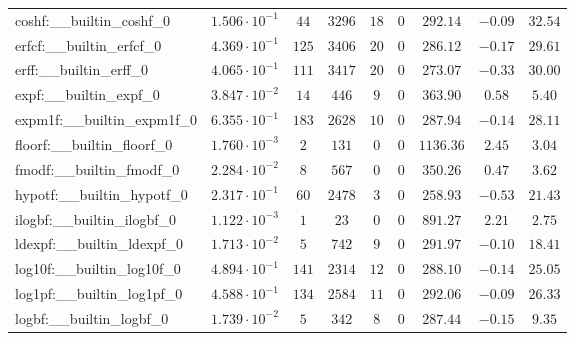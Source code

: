 \begin{tabular}{|l|c|c|c|c|c|c|c|c|}
coshf:\_\_builtin\_coshf\_0               & $ 1.506 \cdot 10^{-1} $ & $ 44     $ & $ 3296  $ & $ 18  $ & $ 0   $ & $ 292.14      $ & $ -0.09   $ & $ 32.54   $ \\
erfcf:\_\_builtin\_erfcf\_0               & $ 4.369 \cdot 10^{-1} $ & $ 125    $ & $ 3406  $ & $ 20  $ & $ 0   $ & $ 286.12      $ & $ -0.17   $ & $ 29.61   $ \\
erff:\_\_builtin\_erff\_0                 & $ 4.065 \cdot 10^{-1} $ & $ 111    $ & $ 3417  $ & $ 20  $ & $ 0   $ & $ 273.07      $ & $ -0.33   $ & $ 30.00   $ \\
expf:\_\_builtin\_expf\_0                 & $ 3.847 \cdot 10^{-2} $ & $ 14     $ & $ 446   $ & $ 9   $ & $ 0   $ & $ 363.90      $ & $ 0.58    $ & $ 5.40    $ \\
expm1f:\_\_builtin\_expm1f\_0             & $ 6.355 \cdot 10^{-1} $ & $ 183    $ & $ 2628  $ & $ 10  $ & $ 0   $ & $ 287.94      $ & $ -0.14   $ & $ 28.11   $ \\
floorf:\_\_builtin\_floorf\_0             & $ 1.760 \cdot 10^{-3} $ & $ 2      $ & $ 131   $ & $ 0   $ & $ 0   $ & $ 1136.36     $ & $ 2.45    $ & $ 3.04    $ \\
fmodf:\_\_builtin\_fmodf\_0               & $ 2.284 \cdot 10^{-2} $ & $ 8      $ & $ 567   $ & $ 0   $ & $ 0   $ & $ 350.26      $ & $ 0.47    $ & $ 3.62    $ \\
hypotf:\_\_builtin\_hypotf\_0             & $ 2.317 \cdot 10^{-1} $ & $ 60     $ & $ 2478  $ & $ 3   $ & $ 0   $ & $ 258.93      $ & $ -0.53   $ & $ 21.43   $ \\
ilogbf:\_\_builtin\_ilogbf\_0             & $ 1.122 \cdot 10^{-3} $ & $ 1      $ & $ 23    $ & $ 0   $ & $ 0   $ & $ 891.27      $ & $ 2.21    $ & $ 2.75    $ \\
ldexpf:\_\_builtin\_ldexpf\_0             & $ 1.713 \cdot 10^{-2} $ & $ 5      $ & $ 742   $ & $ 9   $ & $ 0   $ & $ 291.97      $ & $ -0.10   $ & $ 18.41   $ \\
log10f:\_\_builtin\_log10f\_0             & $ 4.894 \cdot 10^{-1} $ & $ 141    $ & $ 2314  $ & $ 12  $ & $ 0   $ & $ 288.10      $ & $ -0.14   $ & $ 25.05   $ \\
log1pf:\_\_builtin\_log1pf\_0             & $ 4.588 \cdot 10^{-1} $ & $ 134    $ & $ 2584  $ & $ 11  $ & $ 0   $ & $ 292.06      $ & $ -0.09   $ & $ 26.33   $ \\
logbf:\_\_builtin\_logbf\_0               & $ 1.739 \cdot 10^{-2} $ & $ 5      $ & $ 342   $ & $ 8   $ & $ 0   $ & $ 287.44      $ & $ -0.15   $ & $ 9.35    $ \\

\end{tabular}
